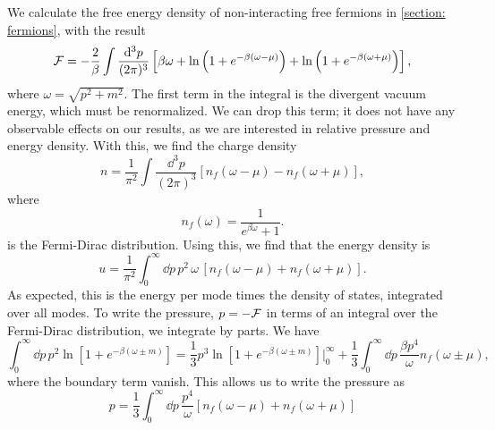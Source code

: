 We calculate the free energy density of non-interacting free fermions in \autoref{section: fermions}, with the result
%
\begin{equation}
    \mathcal{F} = - 
    \frac{2}{\beta}\int \frac{\dd^3 p}{(2 \pi)^3} 
    \left[
        \beta \omega
        +
        \ln\left(1 + e^{-\beta(\omega - \mu)}\right)
        + 
        \ln\left(1 + e^{-\beta(\omega + \mu)}\right)
    \right],
\end{equation}
%
where $\omega = \sqrt{p^2 + m^2}$.
The first term in the integral is the divergent vacuum energy, which must be renormalized.
We can drop this term; it does not have any observable effects on our results, as we are interested in relative pressure and energy density.
With this, we find the charge density
%
\begin{equation}
    n = \frac{1}{\pi^2} \int \frac{\dd^3 p}{(2 \pi)^3} [n_f(\omega - \mu) - n_f(\omega + \mu)],
\end{equation}
%
where
%
\begin{equation}
    n_f(\omega) = \frac{1}{e^{\beta \omega} + 1}.
\end{equation}
%
is the Fermi-Dirac distribution.
Using this, we find that the energy density is
%
\begin{equation}
    \label{energy density}
    u = \frac{1}{\pi^2} \int_0^\infty \dd p\, p^2 \, \omega \, [n_f(\omega - \mu) + n_f(\omega + \mu)].
\end{equation}
%
As expected, this is the energy per mode times the density of states, integrated over all modes.
To write the pressure, $p = - \mathcal{F}$ in terms of an integral over the Fermi-Dirac distribution, we integrate by parts.
We have
%
\begin{equation}
    \int_0^\infty \dd p \, p^2 \ln\left[1 + e^{-\beta(\omega \pm m)}\right]
    = 
    \frac{1}{3} p^3\ln\left[1 + e^{-\beta(\omega \pm m)}\right] \bigg |_0^\infty
    + 
    \frac{1}{3} \int_0^\infty \dd p \, \frac{ \beta p^4}{\omega}n_f(\omega \pm \mu),
\end{equation}
%
where the boundary term vanish.
This allows us to write the pressure as 
%
\begin{equation}
    \label{pressure}
    p = \frac{1}{3} \int_0^\infty \dd p \, \frac{p^4}{\omega} [n_f(\omega - \mu) + n_f(\omega + \mu)]
\end{equation}



